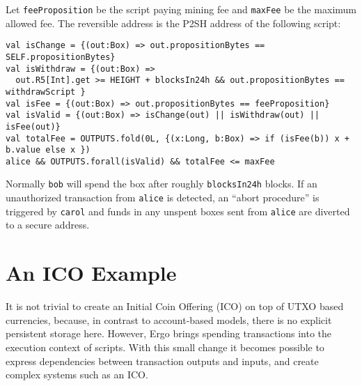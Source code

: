 \documentclass[runningheads]{llncs}
\begin{document}
Let \texttt{feeProposition} be the script paying mining fee and \texttt{maxFee} be the maximum allowed fee. The reversible address is the P2SH address of the following script:
\small{
\begin{verbatim}
val isChange = {(out:Box) => out.propositionBytes == SELF.propositionBytes}
val isWithdraw = {(out:Box) => 
  out.R5[Int].get >= HEIGHT + blocksIn24h && out.propositionBytes == withdrawScript }
val isFee = {(out:Box) => out.propositionBytes == feeProposition}
val isValid = {(out:Box) => isChange(out) || isWithdraw(out) || isFee(out)}
val totalFee = OUTPUTS.fold(0L, {(x:Long, b:Box) => if (isFee(b)) x + b.value else x })
alice && OUTPUTS.forall(isValid) && totalFee <= maxFee
\end{verbatim}
}
Normally \texttt{bob} will spend the box after roughly \texttt{blocksIn24h} blocks. If an unauthorized transaction from \texttt{alice} is detected, an ``abort procedure'' is triggered by \texttt{carol} and funds in any unspent boxes sent from \texttt{alice} are diverted to a secure address. %


\section{An ICO Example}
\label{ico}


It is not trivial to create an Initial Coin Offering (ICO) on top of UTXO based currencies, because, in contrast to account-based models, there is no explicit persistent storage here. However, Ergo brings spending transactions into the execution context of scripts. With this small change it becomes possible to express dependencies between transaction outputs and inputs, and create complex systems such as an ICO.%
\end{document}
